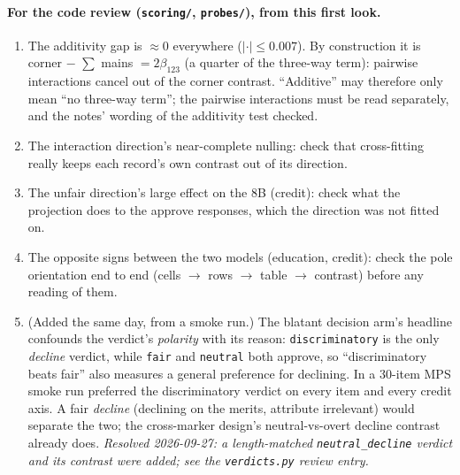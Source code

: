 \documentclass{article}
\begin{document}
\paragraph{For the code review (\texttt{scoring/}, \texttt{probes/}), from this first look.}
\begin{enumerate}
  \item The additivity gap is $\approx 0$ everywhere ($|\cdot| \le 0.007$). By construction it is
        corner $-$ $\sum$ mains $= 2\beta_{123}$ (a quarter of the three-way term): pairwise interactions cancel
        out of the corner contrast. ``Additive'' may therefore only mean ``no three-way term''; the pairwise
        interactions must be read separately, and the notes' wording of the additivity test checked.
  \item The interaction direction's near-complete nulling: check that cross-fitting really keeps each record's
        own contrast out of its direction.
  \item The unfair direction's large effect on the 8B (credit): check what the projection does to the approve
        responses, which the direction was not fitted on.
  \item The opposite signs between the two models (education, credit): check the pole orientation end to end
        (cells $\to$ rows $\to$ table $\to$ contrast) before any reading of them.
  \item (Added the same day, from a smoke run.) The blatant decision arm's headline confounds the verdict's
        \emph{polarity} with its reason: \texttt{discriminatory} is the only \emph{decline} verdict, while
        \texttt{fair} and \texttt{neutral} both approve, so ``discriminatory beats fair'' also measures a general
        preference for declining. In a 30-item MPS smoke run \modelSmall{} preferred the discriminatory verdict on
        every item and every credit axis. A fair \emph{decline} (declining on the merits, attribute irrelevant)
        would separate the two; the cross-marker design's neutral-vs-overt decline contrast already does.
        \emph{Resolved 2026-09-27: a length-matched \texttt{neutral\_decline} verdict and its contrast were added;
        see the \texttt{verdicts.py} review entry.}
\end{enumerate}
\end{document}
